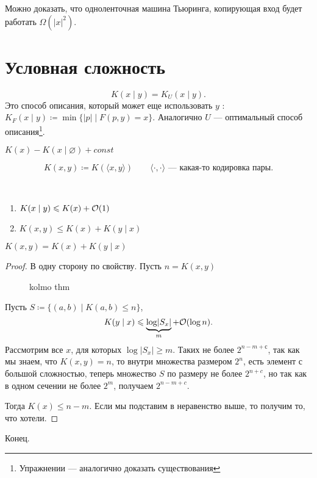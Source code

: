 Можно доказать, что одноленточная машина Тьюринга, копирующая вход будет работать $ \Omega( \lvert x \rvert ^2)$.

\section{Условная сложность}
\[
	K(x \mid y) = K_{U}\left( x \mid y \right) 
.\] 
Это способ описания, который может еще использовать $ y$ : 
$ K_{F}(x \mid y) \coloneqq \min \{\lvert p \rvert \mid F(p, y) = x\}$. Аналогично $ U$ --- оптимальный способ описания\footnote{Упражнении --- аналогично доказать существования}.

\begin{note}
	$ K(x) - K(x \mid \varnothing) + const$
\end{note}
\[
	K(x, y) \coloneqq K(\langle x, y \rangle) \qquad \langle\cdot  , \cdot \rangle\text{ --- какая-то кодировка пары}
.\] 
\begin{prop}
    ~\begin{enumerate}
		\item $ K(x \mid y) \leqslant  K(x) + \mathcal{O}(1)$
		\item $ K(x, y) \le  K(x) + K(y \mid x)$
    \end{enumerate}
\end{prop}

\begin{thm}
	$ K(x, y) =  K(x) + K(y \mid x)$
\end{thm}
\begin{proof}
	В одну сторону по свойству. Пусть  $ n = K(x, y) $ 
\begin{figure}[ht]
    \centering
    \caption{kolmo thm}
    \label{fig:kolmo-thm}
\end{figure}
Пусть $ S \coloneqq \{(a, b) \mid K(a, b) \le n\}$,
\[
	K(y \mid x) \leqslant  \underbrace{\log \lvert   S_x\rvert}_{m} + \mathcal{O}(\log n)
.\] 
Рассмотрим все $ x$, для которых $ \log \lvert S_x \rvert  \ge  m$. Таких не более $ 2^{n-m + с}$, так как мы знаем, что $ K(x, y) = n$, то внутри множества размером  $ 2^{n}$, есть элемент с большой сложностью, теперь множество $ S$ по размеру не более  $ 2^{n+c}$, но так как в одном сечении не более $ 2^{m}$, получаем  $ 2^{n-m+c}$.

Тогда $ K(x) \le n -m $. Если мы подставим в неравенство выше, то получим то, что хотели.
\end{proof}
Конец.
